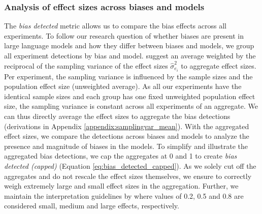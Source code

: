 \subsubsection{Analysis of effect sizes across biases and models}
\label{methodologies:analysisbiasmodels}
\par The \textit{bias detected} metric allows us to compare the bias effects across all experiments. To follow our research question of whether biases are present in large language models and how they differ between biases and models, we group all experiment detections by bias and model. \textcite{morris2002combining} suggest an average weighted by the reciprocal of the sampling variance of the effect sizes $\hat{\sigma}^2_{e_{i}}$ to aggregate effect sizes. Per experiment, the sampling variance is influenced by the sample sizes and the population effect size (unweighted average). As all our experiments have the identical sample sizes and each group has one fixed unweighted population effect size, the sampling variance is constant across all experiments of an aggregate. We can thus directly average the effect sizes to aggregate the bias detections (derivations in Appendix \ref{appendix:samplingvar_mean}). With the aggregated effect sizes, we compare the detections across biases and models to analyze the presence and magnitude of biases in the models. To simplify and illustrate the aggregated bias detections, we cap the aggregates at 0 and 1 to create \textit{bias detected (capped)} (Equation \ref{eq:bias_detected_capped}). As we solely cut off the aggregates and do not rescale the effect sizes themselves, we ensure to correctly weigh extremely large and small effect sizes in the aggregation. Further, we maintain the interpretation guidelines by \textcite{cohen1988statistical} where values of 0.2, 0.5 and 0.8 are considered small, medium and large effects, respectively.

